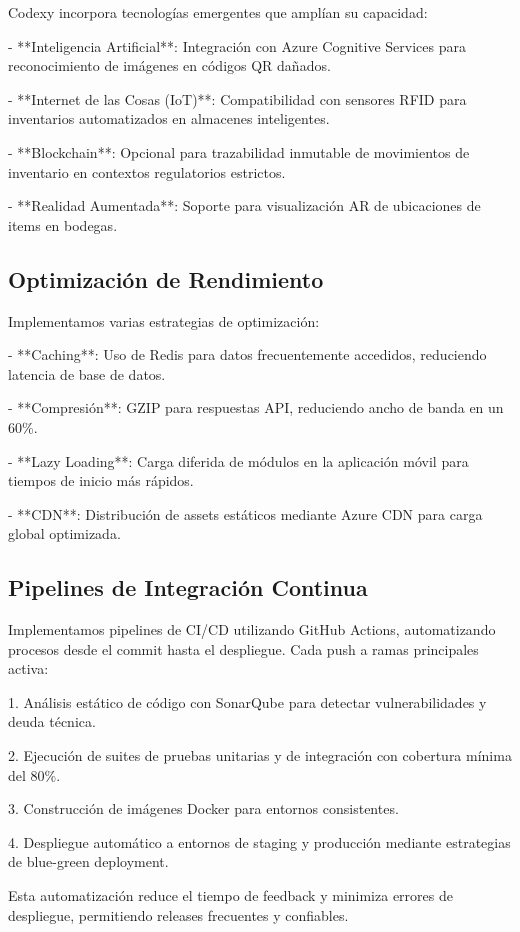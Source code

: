 Codexy incorpora tecnologías emergentes que amplían su capacidad:

- **Inteligencia Artificial**: Integración con Azure Cognitive Services para reconocimiento de imágenes en códigos QR dañados.

- **Internet de las Cosas (IoT)**: Compatibilidad con sensores RFID para inventarios automatizados en almacenes inteligentes.

- **Blockchain**: Opcional para trazabilidad inmutable de movimientos de inventario en contextos regulatorios estrictos.

- **Realidad Aumentada**: Soporte para visualización AR de ubicaciones de items en bodegas.

\subsection{Optimización de Rendimiento}

Implementamos varias estrategias de optimización:

- **Caching**: Uso de Redis para datos frecuentemente accedidos, reduciendo latencia de base de datos.

- **Compresión**: GZIP para respuestas API, reduciendo ancho de banda en un 60\%.

- **Lazy Loading**: Carga diferida de módulos en la aplicación móvil para tiempos de inicio más rápidos.

- **CDN**: Distribución de assets estáticos mediante Azure CDN para carga global optimizada.

\subsection{Pipelines de Integración Continua}

Implementamos pipelines de CI/CD utilizando GitHub Actions, automatizando procesos desde el commit hasta el despliegue. Cada push a ramas principales activa:

1. Análisis estático de código con SonarQube para detectar vulnerabilidades y deuda técnica.

2. Ejecución de suites de pruebas unitarias y de integración con cobertura mínima del 80\%.

3. Construcción de imágenes Docker para entornos consistentes.

4. Despliegue automático a entornos de staging y producción mediante estrategias de blue-green deployment.

Esta automatización reduce el tiempo de feedback y minimiza errores de despliegue, permitiendo releases frecuentes y confiables.

